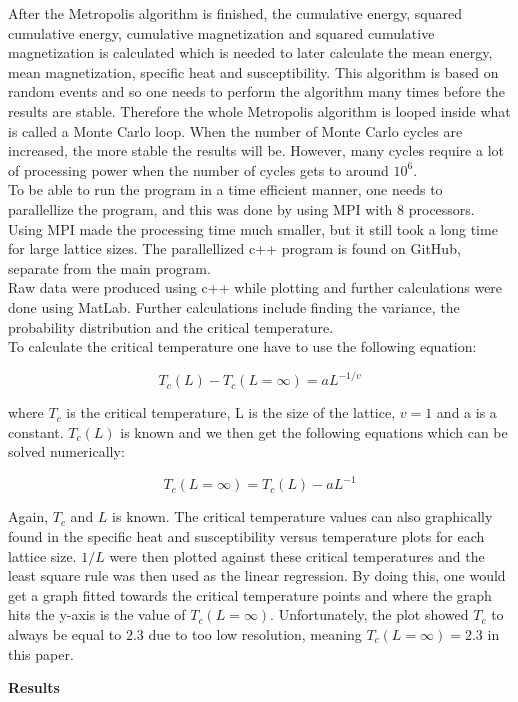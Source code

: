 \documentclass[10pt,a4paper]{article}
\begin{document}
After the Metropolis algorithm is finished, the cumulative energy, squared cumulative energy, cumulative magnetization and squared cumulative magnetization is calculated which is needed to later calculate the mean energy, mean magnetization, specific heat and susceptibility. This algorithm is based on random events and so one needs to perform the algorithm many times before the results are stable. Therefore the whole Metropolis algorithm is looped inside what is called a Monte Carlo loop. When the number of Monte Carlo cycles are increased, the more stable the results will be. However, many cycles require a lot of processing power when the number of cycles gets to around $10^6$.
\\
To be able to run the program in a time efficient manner, one needs to parallellize the program, and this was done by using MPI with 8 processors. Using MPI made the processing time much smaller, but it still took a long time for large lattice sizes. The parallellized c++ program is found on GitHub, separate from the main program.
\\
Raw data were produced using c++ while plotting and further calculations were done using MatLab. Further calculations include finding the variance, the probability distribution and the critical temperature.  
\\
To calculate the critical temperature one have to use the following equation:

$$
T_c(L) - T_c(L=\infty) = aL^{-1/v}
$$

\noindent where $T_c$ is the critical temperature, L is the size of the lattice, $v = 1$ and a is a constant. $T_c(L)$ is known and we then get the following equations which can be solved numerically:

$$
T_c(L = \infty) = T_c(L) - aL^{-1}
$$

\noindent Again, $T_c$ and $L$ is known. The critical temperature values can also graphically found in the specific heat and susceptibility versus temperature plots for each lattice size. $1/L$ were then plotted against these critical temperatures and the least square rule was then used as the linear regression. By doing this, one would get a graph fitted towards the critical temperature points and where the graph hits the y-axis is the value of $T_c(L = \infty)$. Unfortunately, the plot showed $T_c$ to always be equal to $2.3$ due to too low resolution, meaning $T_c(L = \infty) = 2.3$ in this paper.

\newpage

\begin{center}
{\LARGE\bf Results}
\end{center}
\end{document}

